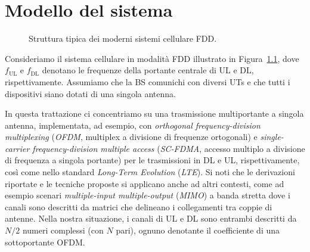 \chapter{Modello del sistema}

\thispagestyle{empty}

\begin{figure}[ht]
    \centering
    
    \caption{Struttura tipica dei moderni sistemi cellulare FDD.}
    \label{fig:fdd-system}
\end{figure}

Consideriamo il sistema cellulare in modalità FDD illustrato in
Figura~\ref{fig:fdd-system}, dove \(f_\mathrm{UL}\) e \(f_\mathrm{DL}\)
denotano le frequenze della portante centrale di UL e DL, rispettivamente.
Assumiamo che la BS comunichi con diversi UTs e che tutti i dispositivi siano
dotati di una singola antenna.

In questa trattazione ci concentriamo su una trasmissione multiportante a
singola antenna, implementata, ad esempio, con \textit{orthogonal
frequency-division multiplexing} (\textit{OFDM}, multiplex a divisione di
frequenze ortogonali) e \textit{single-carrier frequency-division multiple
access} (\textit{SC-FDMA}, accesso multiplo a divisione di frequenza a singola
portante) per le trasmissioni in DL e UL, rispettivamente, così come nello
standard \textit{Long-Term Evolution} (\textit{LTE}). Si noti che le
derivazioni riportate e le tecniche proposte si applicano anche ad altri
contesti, come ad esempio scenari \textit{multiple-input multiple-output}
(\textit{MIMO}) a banda stretta dove i canali sono descritti da matrici che
delineano i collegamenti tra coppie di antenne. Nella nostra situazione, i
canali di UL e DL sono entrambi descritti da \(N/2\) numeri complessi (con
\(N\) pari), ognuno denotante il coefficiente di una sottoportante
OFDM.\footnotemark


